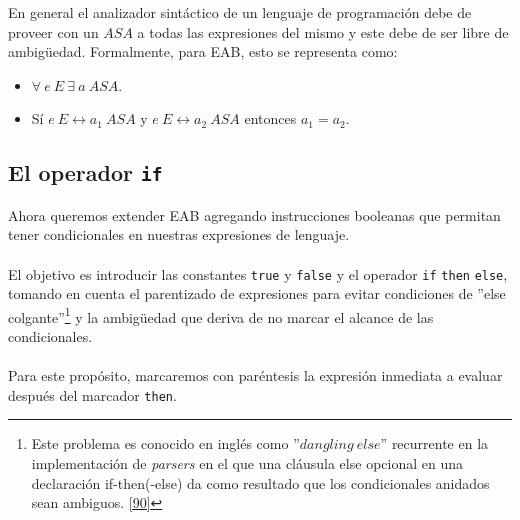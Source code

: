     En general el analizador sintáctico de un lenguaje de programación debe de proveer con un $ASA$ a todas las expresiones del mismo y este debe de ser libre de ambigüedad. Formalmente, para \textsf{EAB}, esto se representa como:
\begin{itemize}
	\item $\forall \ e\ E \ \exists \ a \ ASA$.
	\item Sí $e \ E \longleftrightarrow a_1 \ ASA$ y $e \ E \longleftrightarrow a_2 \ ASA $ entonces $a_1 = a_2$.
\end{itemize}

\subsection{El operador \texttt{if}}
    Ahora queremos extender \textsf{EAB} agregando instrucciones booleanas que permitan tener condicionales en nuestras expresiones de lenguaje. \\\\
El objetivo es introducir las constantes \texttt{true} y \texttt{false} y el operador \texttt{if}  \texttt{then} \texttt{else}, tomando en cuenta el parentizado de expresiones para evitar condiciones de ''else colgante''\footnote{Este problema es conocido en inglés como ''$dangling\ else$'' recurrente en la implementación de \textit{parsers} en el que una cláusula else opcional en una declaración if-then(-else) da como resultado que los condicionales anidados sean ambiguos. \hyperlink{90}{[90]}} y la ambigüedad que deriva de no marcar el alcance de las condicionales.\\\\
Para este propósito, marcaremos con paréntesis la expresión inmediata a evaluar después del marcador \texttt{then}.

